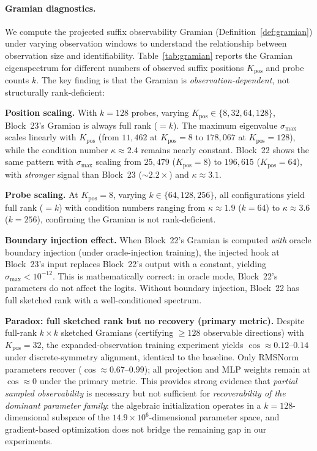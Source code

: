 \documentclass{article}
\begin{document}
\paragraph{Gramian diagnostics.}
We compute the projected suffix observability Gramian (Definition~\ref{def:gramian}) under varying observation windows to understand the relationship between observation size and identifiability. Table~\ref{tab:gramian} reports the Gramian eigenspectrum for different numbers of observed suffix positions $K_{\text{pos}}$ and probe counts $k$. The key finding is that the Gramian is \emph{observation-dependent}, not structurally rank-deficient:

\textbf{Position scaling.} With $k{=}128$ probes, varying $K_{\text{pos}} \in \{8, 32, 64, 128\}$, Block~23's Gramian is always full rank ($= k$). The maximum eigenvalue $\sigma_{\max}$ scales linearly with $K_{\text{pos}}$ (from $11{,}462$ at $K_{\text{pos}}{=}8$ to $178{,}067$ at $K_{\text{pos}}{=}128$), while the condition number $\kappa \approx 2.4$ remains nearly constant. Block~22 shows the same pattern with $\sigma_{\max}$ scaling from $25{,}479$ ($K_{\text{pos}}{=}8$) to $196{,}615$ ($K_{\text{pos}}{=}64$), with \emph{stronger} signal than Block~23 ($\sim 2.2\times$) and $\kappa \approx 3.1$.

\textbf{Probe scaling.} At $K_{\text{pos}}{=}8$, varying $k \in \{64, 128, 256\}$, all configurations yield full rank ($= k$) with condition numbers ranging from $\kappa \approx 1.9$ ($k{=}64$) to $\kappa \approx 3.6$ ($k{=}256$), confirming the Gramian is not rank-deficient.

\textbf{Boundary injection effect.} When Block~22's Gramian is computed \emph{with} oracle boundary injection (under oracle-injection training), the injected hook at Block~23's input replaces Block~22's output with a constant, yielding $\sigma_{\max} < 10^{-12}$. This is mathematically correct: in oracle mode, Block~22's parameters do not affect the logits. Without boundary injection, Block~22 has full sketched rank with a well-conditioned spectrum.

\textbf{Paradox: full sketched rank but no recovery (primary metric).} Despite full-rank $k \times k$ sketched Gramians (certifying $\geq 128$ observable directions) with $K_{\text{pos}}{=}32$, the expanded-observation training experiment yields $\cos \approx 0.12$--$0.14$ under discrete-symmetry alignment, identical to the baseline. Only RMSNorm parameters recover ($\cos \approx 0.67$--$0.99$); all projection and MLP weights remain at $\cos \approx 0$ under the primary metric. This provides strong evidence that \emph{partial sampled observability} is necessary but not sufficient for \emph{recoverability of the dominant parameter family}: the algebraic initialization operates in a $k{=}128$-dimensional subspace of the $14.9 \times 10^6$-dimensional parameter space, and gradient-based optimization does not bridge the remaining gap in our experiments.
\end{document}
